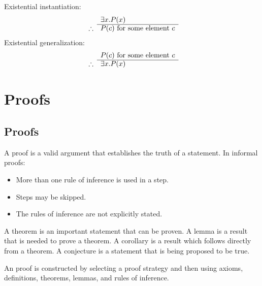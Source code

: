 Existential instantiation:
\begin{equation}
    \begin{array}{r l}
                   & \exists x. P(x)                  \\
        \cline{2-2}
        \therefore & P(c) \text{ for some element } c
    \end{array}
\end{equation}
Existential generalization:
\begin{equation}
    \begin{array}{r l}
                   & P(c) \text{ for some element } c \\
        \cline{2-2}
        \therefore & \exists x. P(x)
    \end{array}
\end{equation}

\section{Proofs}
\subsection{Proofs}
A proof is a valid argument that establishes the truth of a statement. In informal proofs:
\begin{itemize}
    \item More than one rule of inference is used in a step.
    \item Steps may be skipped.
    \item The rules of inference are not explicitly stated.
\end{itemize}
A theorem is an important statement that can be proven. A lemma is a result that is needed to prove a theorem. A corollary is a result which follows directly from a theorem. A conjecture is a statement that is being proposed to be true.

An proof is constructed by selecting a proof strategy and then using axioms, definitions, theorems, lemmas, and rules of inference.

